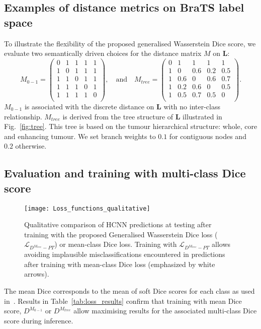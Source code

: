 \documentclass[runningheads,orivec,a4paper]{llncs}
\begin{document}
\subsection{Examples of distance metrics on BraTS label space}
To illustrate the flexibility of the proposed generalised Wasserstein
Dice score, we evaluate two semantically driven choices for the
distance matrix $M$ on $\mathbf{L}$: 
\[
M_{0-1}= \begin{pmatrix}
0  & 1 & 1 & 1 & 1 \\
1  & 0 & 1 & 1 & 1 \\
1  & 1 & 0 & 1 & 1 \\
1  & 1 & 1 & 0 & 1 \\
1  & 1 & 1 & 1 & 0 \\
\end{pmatrix}, \quad \textrm{and} \quad
M_{tree}= \begin{pmatrix}
0  & 1 & 1 & 1 & 1 \\
1  & 0 & 0.6 & 0.2 & 0.5 \\
1  & 0.6 & 0 & 0.6 & 0.7 \\
1  & 0.2 & 0.6 & 0 & 0.5 \\
1  & 0.5 & 0.7 & 0.5 & 0 \\
\end{pmatrix}.
\]
$M_{0-1}$ is associated with the discrete distance on $\mathbf{L}$ with no inter-class relationship. 
$M_{tree}$ is derived from the tree structure of $\mathbf{L}$
illustrated in Fig.~\ref{fig:tree}.
This tree is based on the tumour hierarchical structure: whole, core and enhancing tumour. We set branch weights to $0.1$ for contiguous nodes and $0.2$ otherwise.

\subsection{Evaluation and training with multi-class Dice score}

\begin{figure}[t!]
	\centering
	\texttt{[image: Loss\_functions\_qualitative]}
	\caption{Qualitative comparison of HCNN predictions at testing after training with the proposed Generalised Wasserstein Dice loss ($\mathcal{L}_{D^{M_{tree}}-PT}$) or mean-class Dice loss. Training with $\mathcal{L}_{D^{M_{tree}}-PT}$ allows avoiding implausible misclassifications encountered in predictions after training with mean-class Dice loss (emphasized by white arrows).}
	\label{fig:loss_quali}
\end{figure}
The mean Dice corresponds to the mean of soft Dice scores for each class as used in~\cite{scalenet,highresnet}.
Results in Table~\ref{tab:loss_results} confirm that training with mean Dice score, $D^{M_{0-1}}$ or 
 $D^{M_{tree}}$ allow maximising results for the associated multi-class Dice score during inference.
\end{document}
